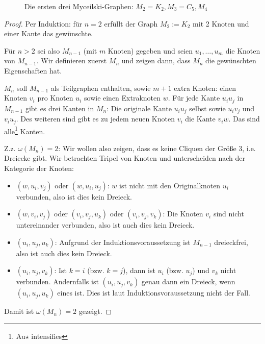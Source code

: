 \documentclass[../main.tex]{subfiles}
\begin{document}
\begin{figure}[ht]
    \caption{Die ersten drei Myceilski-Graphen: $M_2 = K_2, M_3 = C_5, M_4$}
\end{figure}
\begin{proof}
    Per Induktion: für $n = 2$ erfüllt der Graph $M_2 := K_2$ mit 2 Knoten und einer Kante das gewünschte.

    Für $n > 2$ sei also $M_{n-1}$ (mit $m$ Knoten) gegeben und seien $u_1, \hdots, u_m$ die Knoten von $M_{n-1}$. Wir definieren zuerst $M_n$ und zeigen dann, dass $M_n$ die gewünschten Eigenschaften hat.

    $M_n$ soll $M_{n-1}$ als Teilgraphen enthalten, sowie $m+1$ extra Knoten: einen Knoten $v_i$ pro Knoten $u_i$ sowie einen Extraknoten $w$. Für jede Kante $u_iu_j$ in $M_{n-1}$ gibt es drei Kanten in $M_n$: Die originale Kante $u_iu_j$ selbst sowie $u_iv_j$ und $v_iu_j$. Des weiteren sind gibt es zu jedem neuen Knoten $v_i$ die Kante $v_iw$. Das sind alle\footnote{Au$\star$ intensifies} Kanten.
    
    Z.z. $\omega(M_n) = 2$: Wir wollen also zeigen, dass es keine Cliquen der Größe 3, i.e. Dreiecke gibt. Wir betrachten Tripel von Knoten und unterscheiden nach der Kategorie der Knoten:
    \begin{itemize}
        \item $(w, u_i, v_j)$ oder $(w, u_i, u_j)$: $w$ ist nicht mit den Originalknoten $u_i$ verbunden, also ist dies kein Dreieck.
        \item $(w, v_i, v_j)$ oder $(v_i, v_j, u_k)$ oder $(v_i, v_j, v_k)$: Die Knoten $v_i$ sind nicht untereinander verbunden, also ist auch dies kein Dreieck.
        \item $(u_i, u_j, u_k)$: Aufgrund der Induktionsvoraussetzung ist $M_{n-1}$ dreieckfrei, also ist auch dies kein Dreieck.
        \item $(u_i, u_j, v_k)$: Ist $k=i$ (bzw. $k=j$), dann ist $u_i$ (bzw. $u_j$) und $v_k$ nicht verbunden. Andernfalls ist $(u_i, u_j, v_k)$ genau dann ein Dreieck, wenn $(u_i, u_j, u_k)$ eines ist. Dies ist laut Induktionsvoraussetzung nicht der Fall.
    \end{itemize}
    Damit ist $\omega(M_n) = 2$ gezeigt.


\end{proof}
\end{document}
